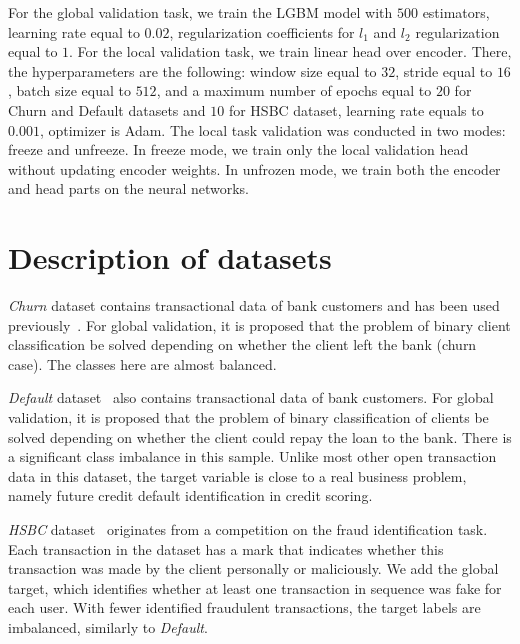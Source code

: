 For the global validation task, we train the LGBM model with $500$ estimators, learning rate equal to $0.02$, regularization coefficients for $l_1$ and $l_2$ regularization equal to $1$. For the local validation task, we train linear head over encoder. There, the hyperparameters are the following: window size equal to $32$, stride equal to $16$, batch size equal to $512$, and a maximum number of epochs equal to $20$ for Churn and Default datasets and $10$ for HSBC dataset, learning rate equals to $0.001$, optimizer is Adam. The local task validation was conducted in two modes: freeze and unfreeze. In freeze mode, we train only the local validation head without updating encoder weights. In unfrozen mode, we train both the encoder and head parts on the neural networks.

\section{Description of datasets}
\label{sec:app_datasets}

\emph{Churn} dataset contains transactional data of bank customers and has been used previously~\cite{babaev2022coles}.
For global validation, it is proposed that the problem of binary client classification be solved depending on whether the client left the bank (churn case).
The classes here are almost balanced.

\emph{Default} dataset~\cite{bazarova2024universal} also contains transactional data of bank customers.
For global validation, it is proposed that the problem of binary classification of clients be solved depending on whether the client could repay the loan to the bank.
There is a significant class imbalance in this sample.
Unlike most other open transaction data in this dataset, the target variable is close to a real business problem, namely future credit default identification in credit scoring.








\emph{HSBC} dataset~\cite{bazarova2024universal} originates from a competition on the fraud identification task.
Each transaction in the dataset has a mark that indicates whether this transaction was made by the client personally or maliciously. 
We add the global target, which identifies whether at least one transaction in sequence was fake for each user.
With fewer identified fraudulent transactions, the target labels are imbalanced, similarly to \emph{Default}.

